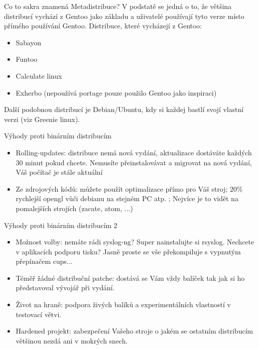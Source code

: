 \documentclass{beamer}
\begin{document}
\begin{frame}{Co to sakra znamená Metadistribuce?}
	V podstatě se jedná o to, že většina distribucí vychází z Gentoo jako základu a uživatelé používají tyto verze místo přímého používání Gentoo.
	Distribuce, které vycházejí z Gentoo:
	\begin{itemize}
		\item Sabayon
		\item Funtoo
		\item Calculate linux
		\item Exherbo (nepoužívá portage pouze použilo Gentoo jako inspiraci)
	\end{itemize}
	Další podobnou distribucí je Debian/Ubuntu, kdy si každej  bastlí svojí vlastní verzi (viz Greenie linux).
\end{frame}

\begin{frame}{Výhody proti binárním distribucím}
	\begin{itemize}
		\item Rolling-updates: distribuce nemá nová vydání, aktualizace dostáváte každých 30 minut pokud chcete. Nemusíte přeinstalovávat a migrovat na nová vydání, Váš počítač je stále aktuální
		\item Ze zdrojových kódů: můžete použít optimalizace přímo pro Váš stroj; 20\% rychlejší opengl vůči debianu na stejném PC atp. ; Nejvíce je to vidět na pomalejších strojích (zacate, atom, ...)
	\end{itemize}
\end{frame}
\begin{frame}{Výhody proti binárním distribucím 2}
	\begin{itemize}
		\item Možnost volby: nemáte rádi syslog-ng? Super nainstalujte si rsyslog. Nechcete v aplikacích podporu tisku? Jasně proste se vše překompiluje s vypnutým přepínačem cups...
		\item Téměř žádné distribuční patche: dostává se Vám vždy balíček tak jak si ho představoval vývojář při vydání.
		\item Život na hraně: podpora živých balíků a experimentálních vlastností v testovací větvi.
		\item Hardened projekt: zabezpečení Vašeho stroje o jakém se ostatním distribucím většinou nezdá ani v mokrých snech.
	\end{itemize}
\end{frame}
\end{document}
